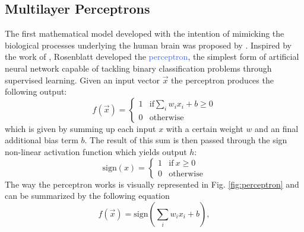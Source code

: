 \subsection{Multilayer Perceptrons}
\label{sec:general_architecture}
The first mathematical model developed with the intention of mimicking the biological processes underlying the human brain was proposed by \citet{rosenblatt1958perceptron}. Inspired by the work of \citet{mcculloch1943logical}, Rosenblatt developed the \textcolor{RoyalBlue}{perceptron}, the simplest form of artificial neural network capable of tackling binary classification problems through supervised learning. Given an input vector $\vec{x}$ the perceptron produces the following output:
\begin{equation}
	f(\vec{x}) = 
		\begin{cases}
			1  & \text{if} \sum_i w_i x_i + b \geq 0 \\
			0 & \text{otherwise}
		\end{cases}
\end{equation}
which is given by summing up each input $x$ with a certain weight $w$ and an final additional bias term $b$. The result of this sum is then passed through the sign non-linear activation function which yields output $h$:
\begin{equation}
	\text{sign}(x) = 
		\begin{cases}
			1  & \text{if} \: x \geq 0 \\
			0 & \text{otherwise}
		\end{cases}
\end{equation}
The way the perceptron works is visually represented in Fig. \ref{fig:perceptron} and can be summarized by the following equation
\begin{equation}
	f(\vec{x}) = \text{sign}(\sum_i w_i x_i + b),
	\label{eq:perceptron_equation}
\end{equation}

